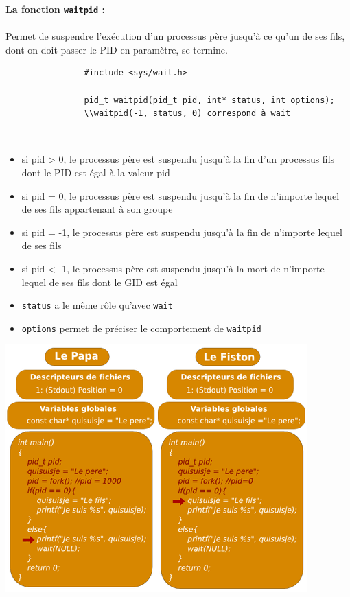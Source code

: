 		\begin{frame}[containsverbatim]
			\textbf{La fonction \lstinline!waitpid! :} 
			\\~\\
			Permet de suspendre l'exécution d'un processus père jusqu'à ce qu'un de ses fils, dont on doit passer le PID en paramètre, se termine.~\\
			\begin{lstlisting}
				#include <sys/wait.h>

				pid_t waitpid(pid_t pid, int* status, int options);
				\\waitpid(-1, status, 0) correspond à wait
			\end{lstlisting}
			~\\
			\begin{itemize}
				\item si pid > 0, le processus père est suspendu jusqu'à la fin d'un processus fils dont le PID est égal à la valeur pid
				\item si pid = 0, le processus père est suspendu jusqu'à la fin de n'importe lequel de ses fils appartenant à son groupe
				\item si pid = -1, le processus père est suspendu jusqu'à la fin de n'importe lequel de ses fils
				\item si pid < -1, le processus père est suspendu jusqu'à la mort de n'importe lequel de ses fils dont le GID est égal
				\item \lstinline!status! a le même rôle qu'avec \lstinline!wait!
				\item \lstinline!options! permet de préciser le comportement de \lstinline!waitpid!
			\end{itemize}
		\end{frame}	
		
		\begin{frame}
			\begin{center}\includegraphics[scale=0.6]{img/fork1.png}\end{center}
		\end{frame}	
		
